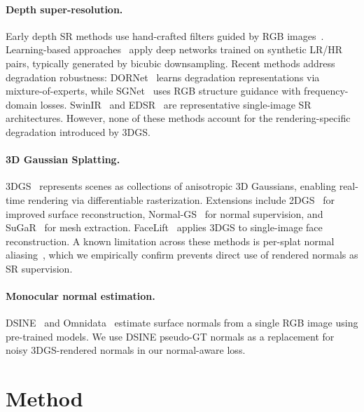 \documentclass[10pt,twocolumn,letterpaper]{article}
\begin{document}
\paragraph{Depth super-resolution.}
Early depth SR methods use hand-crafted filters guided by RGB images~\cite{kopf2007joint}.
Learning-based approaches~\cite{hui2016duf,tang2021bridgenet} apply deep networks trained on synthetic LR/HR pairs, typically generated by bicubic downsampling.
Recent methods address degradation robustness: DORNet~\cite{yan2025dornet} learns degradation representations via mixture-of-experts, while SGNet~\cite{yan2024sgnet} uses RGB structure guidance with frequency-domain losses.
SwinIR~\cite{liang2021swinir} and EDSR~\cite{lim2017edsr} are representative single-image SR architectures.
However, none of these methods account for the rendering-specific degradation introduced by 3DGS.

\paragraph{3D Gaussian Splatting.}
3DGS~\cite{kerbl20233dgs} represents scenes as collections of anisotropic 3D Gaussians, enabling real-time rendering via differentiable rasterization.
Extensions include 2DGS~\cite{huang20242dgs} for improved surface reconstruction, Normal-GS~\cite{jiang2024normalgs} for normal supervision, and SuGaR~\cite{guedon2024sugar} for mesh extraction.
FaceLift~\cite{wu2024facelift} applies 3DGS to single-image face reconstruction.
A known limitation across these methods is per-splat normal aliasing~\cite{jiang2024normalgs,huang20242dgs,dai2024dnsplatter}, which we empirically confirm prevents direct use of rendered normals as SR supervision.

\paragraph{Monocular normal estimation.}
DSINE~\cite{bae2024dsine} and Omnidata~\cite{eftekhar2021omnidata} estimate surface normals from a single RGB image using pre-trained models.
We use DSINE pseudo-GT normals as a replacement for noisy 3DGS-rendered normals in our normal-aware loss.

\section{Method}
\label{sec:method}
\end{document}
